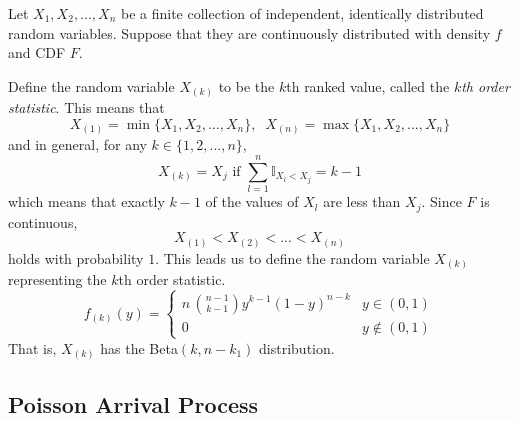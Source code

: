 \documentclass{article}
\begin{document}
    Let $X_1, X_2, ..., X_n$ be a finite collection of independent, identically distributed random variables. Suppose that they are continuously distributed with density $f$ and CDF $F$. 

    \begin{definition}
      Define the random variable $X_{(k)}$ to be the $k$th ranked value, called the \textit{$k$th order statistic}. This means that 
      \begin{equation}
        X_{(1)} = \min\{X_1, X_2, ..., X_n\}, \;\; X_{(n)} = \max\{X_1, X_2, ..., X_n\}
      \end{equation}
      and in general, for any $k \in \{1, 2, ..., n\}$, 
      \begin{equation}
        X_{(k)} = X_j \text{ if } \sum_{l=1}^n \mathbb{I}_{X_l < X_j} = k - 1
      \end{equation}
      which means that exactly $k-1$ of the values of $X_l$ are less than $X_j$. Since $F$ is continuous, 
      \begin{equation}
        X_{(1)} < X_{(2)} < ... < X_{(n)}
      \end{equation}
      holds with probability $1$. This leads us to define the random variable $X_{(k)}$ representing the $k$th order statistic.
      \begin{equation}
        f_{(k)} (y) = \begin{cases} 
          n \, \binom{n-1}{k-1} y^{k-1} (1-y)^{n-k} & y \in (0, 1) \\
        0 & y \not\in (0,1)
        \end{cases}
      \end{equation}
      That is, $X_{(k)}$ has the Beta$(k, n-k_1)$ distribution. 
    \end{definition}

  \subsection{Poisson Arrival Process}
\end{document}
